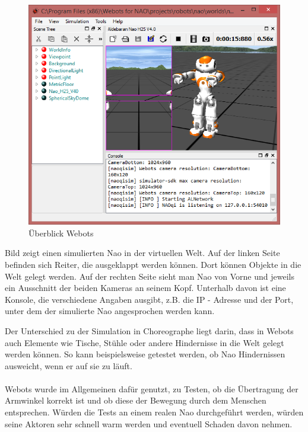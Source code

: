 \begin{figure}[H]						
	\centering							
	\includegraphics[scale=1.0]{Bilder/webots.png}			
	\caption{Überblick Webots}						
	\label{f:nao_webots}						
\end{figure}
\noindent
Bild  zeigt einen simulierten Nao in der virtuellen Welt. Auf der linken Seite befinden sich Reiter, die ausgeklappt werden können. Dort können Objekte in die Welt gelegt werden. Auf der rechten Seite sieht man Nao von Vorne und jeweils ein Ausschnitt der beiden Kameras an seinem Kopf. Unterhalb davon ist eine Konsole, die verschiedene Angaben ausgibt, z.B. die IP - Adresse und der Port, unter dem der simulierte Nao angesprochen werden kann.

Der Unterschied zu der Simulation in Choreographe liegt darin, dass in Webots auch Elemente wie Tische, Stühle oder andere Hindernisse in die Welt gelegt werden können. So kann beispielsweise getestet werden, ob Nao Hindernissen ausweicht, wenn er auf sie zu läuft.
\\
\\
Webots wurde im Allgemeinen dafür genutzt, zu Testen, ob die Übertragung der Armwinkel korrekt ist und ob diese der Bewegung durch dem Menschen entsprechen. Würden die Tests an einem realen Nao durchgeführt werden, würden seine Aktoren sehr schnell warm werden und eventuell Schaden davon nehmen.





